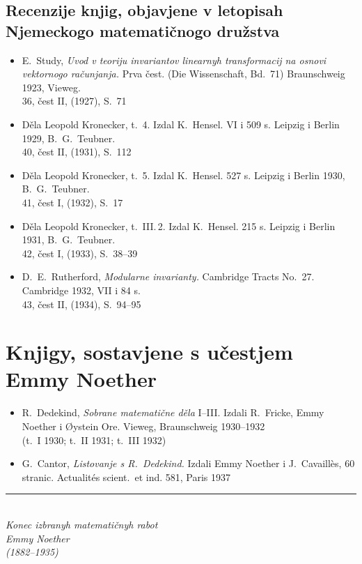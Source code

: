 \documentclass[11pt]{article}
\newcommand{\foreign}[1]{#1}
\begin{document}
\subsection*{Recenzije knjig, objavjene v letopisah Njemeckogo matematičnogo družstva}

\begin{itemize}[leftmargin=1.5em,itemsep=0.2em]
\item E.\ Study, \textit{Uvod v teoriju invariantov linearnyh transformacij na osnovi vektornogo računjanja.} Prva čest. (\foreign{Die Wissenschaft}, Bd.~71) \foreign{Braunschweig} 1923, \foreign{Vieweg}.\\
36, čest II, (1927), S.~71

\item Děla Leopold Kronecker, t.~4. Izdal K.\ Hensel. VI i 509 s. Leipzig i Berlin 1929, B.\ G.\ Teubner.\\
40, čest II, (1931), S.~112

\item Děla Leopold Kronecker, t.~5. Izdal K.\ Hensel. 527 s. Leipzig i Berlin 1930, B.\ G.\ Teubner.\\
41, čest I, (1932), S.~17

\item Děla Leopold Kronecker, t.~III.\,2. Izdal K.\ Hensel. 215 s. Leipzig i Berlin 1931, B.\ G.\ Teubner.\\
42, čest I, (1933), S.~38--39

\item D.\ E.\ Rutherford, \textit{Modularne invarianty.} \foreign{Cambridge Tracts No.~27.} Cambridge 1932, VII i 84 s.\\
43, čest II, (1934), S.~94--95
\end{itemize}

\newpage
\section*{Knjigy, sostavjene s učestjem Emmy Noether}

\begin{itemize}[leftmargin=1.5em,itemsep=0.5em]
\item R.\ Dedekind, \textit{Sobrane matematične děla} I--III. Izdali R.\ Fricke, Emmy Noether i \foreign{Øystein Ore}. \foreign{Vieweg}, \foreign{Braunschweig} 1930--1932\\
(t.~I 1930; t.~II 1931; t.~III 1932)

\item G.\ Cantor, \textit{Listovanje s R.\ Dedekind.} Izdali Emmy Noether i \foreign{J.\ Cavaillès}, 60 stranic. \foreign{Actualités scient.\ et ind.} 581, Paris 1937
\end{itemize}

\vfill

\begin{center}
\rule{0.5\textwidth}{0.4pt}\\[1em]
\textit{Konec izbranyh matematičnyh rabot}\\[0.5em]
\textit{Emmy Noether}\\[0.5em]
\textit{(1882--1935)}
\end{center}
\end{document}
